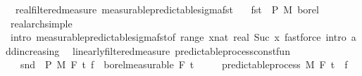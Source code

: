 \begin{isabellebody}
\endisatagproof
{\isafoldproof}%
%
\isadelimproof
\isanewline
%
\endisadelimproof
\isanewline
{}\isamarkupfalse%
\ {\isacharparenleft}{\kern0pt}\ real{\isacharunderscore}{\kern0pt}filtered{\isacharunderscore}{\kern0pt}measure{\isacharparenright}{\kern0pt}\ measurable{\isacharunderscore}{\kern0pt}predictable{\isacharunderscore}{\kern0pt}sigma{\isacharunderscore}{\kern0pt}fst{\isacharprime}{\kern0pt}{\isacharcolon}{\kern0pt}\isanewline
\ \ \ {\isachardoublequoteopen}fst\ {\isasymin}\ {\isasymSigma}\isactrlsub P\ {\isasymrightarrow}\isactrlsub M\ borel{\isachardoublequoteclose}\isanewline
%
\isadelimproof
\ \ %
\endisadelimproof
%
\isatagproof
{}\isamarkupfalse%
\ real{\isacharunderscore}{\kern0pt}arch{\isacharunderscore}{\kern0pt}simple\ \isamarkupfalse%
\ {\isacharparenleft}{\kern0pt}intro\ measurable{\isacharunderscore}{\kern0pt}predictable{\isacharunderscore}{\kern0pt}sigma{\isacharunderscore}{\kern0pt}fst{\isacharbrackleft}{\kern0pt}of\ {\isachardoublequoteopen}range\ {\isacharparenleft}{\kern0pt}{\isasymlambda}x{\isacharcolon}{\kern0pt}{\isacharcolon}{\kern0pt}nat{\isachardot}{\kern0pt}\ {\isacharbraceleft}{\kern0pt}{}{\isacharless}{\kern0pt}{\isachardot}{\kern0pt}{\isachardot}{\kern0pt}real\ {\isacharparenleft}{\kern0pt}Suc\ x{\isacharparenright}{\kern0pt}{\isacharbraceright}{\kern0pt}{\isacharparenright}{\kern0pt}{\isachardoublequoteclose}{\isacharbrackright}{\kern0pt}{\isacharparenright}{\kern0pt}\ {\isacharparenleft}{\kern0pt}fastforce\ intro{\isacharcolon}{\kern0pt}\ add{\isacharunderscore}{\kern0pt}increasing{\isacharparenright}{\kern0pt}{\isacharplus}{\kern0pt}%
\endisatagproof
{\isafoldproof}%
%
\isadelimproof
\isanewline
%
\endisadelimproof
\isanewline
\isanewline
\isanewline
{}\isamarkupfalse%
\ {\isacharparenleft}{\kern0pt}\ linearly{\isacharunderscore}{\kern0pt}filtered{\isacharunderscore}{\kern0pt}measure{\isacharparenright}{\kern0pt}\ predictable{\isacharunderscore}{\kern0pt}process{\isacharunderscore}{\kern0pt}const{\isacharunderscore}{\kern0pt}fun{\isacharcolon}{\kern0pt}\isanewline
\ \ \ {\isachardoublequoteopen}snd\ {\isasymin}\ {\isasymSigma}\isactrlsub P\ {\isasymrightarrow}\isactrlsub M\ F\ t\ {\isachardoublequoteopen}f\ {\isasymin}\ borel{\isacharunderscore}{\kern0pt}measurable\ {\isacharparenleft}{\kern0pt}F\ t\isanewline
\ \ \ \ \ {\isachardoublequoteopen}predictable{\isacharunderscore}{\kern0pt}process\ M\ F\ t\ {\isacharparenleft}{\kern0pt}{\isasymlambda}{\isacharunderscore}{\kern0pt}{\isachardot}{\kern0pt}\ f{\isacharparenright}{\kern0pt}{\isachardoublequoteclose}\isanewline

\end{isabellebody}
